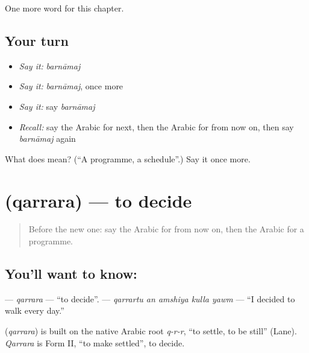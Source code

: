 \begin{grammarlens}[title={What you've built}]
One more word for this chapter.
\end{grammarlens}

\subsection*{Your turn}
\begin{itemize}
\raggedright
  \item \emph{Say it:} \emph{barnāmaj}
  \item \emph{Say it:} \emph{barnāmaj}, once more
  \item \emph{Say it:} say \emph{barnāmaj}
  \item \emph{Recall:} say the Arabic for next, then the Arabic for from now on, then say \emph{barnāmaj} again
\end{itemize}

\begin{tcolorbox}[breakable,colback=teal!4,colframe=teal!35!black,title={Before you move on}]
What does  mean? (\textquotedblleft{}A programme, a schedule\textquotedblright{}.) Say it once more.
\end{tcolorbox}
\section[\texorpdfstring{\ar{قرر} (qarrara)}{قرر (qarrara)}]{ (qarrara) — to decide}

\label{lesson:AR-C157-qarrara}



\begin{quote}
Before the new one: say the Arabic for from now on, then the Arabic for a programme.
\end{quote}

\subsection*{You'll want to know: }
\textbf{} — \emph{qarrara} — \textquotedblleft{}to decide\textquotedblright{}. \textbf{    } — \emph{qarrartu an amshiya kulla yawm} — \textquotedblleft{}I decided to walk every day.\textquotedblright{}

\begin{cousinweb}
\textbf{} (\emph{qarrara}) is built on the native Arabic root \emph{q-r-r}, \textquotedblleft{}to settle, to be still\textquotedblright{} (Lane). \emph{Qarrara} is Form II, \textquotedblleft{}to make settled\textquotedblright{}, to decide.
\end{cousinweb}

